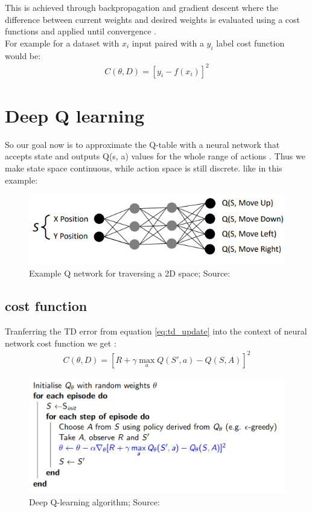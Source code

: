 This is achieved through backpropagation and gradient descent where the difference between current weights and desired weights is evaluated using a cost functions and applied until convergence \cite{lecture_intro_to_deep_rl} .\\

For example for a dataset with $x_i$ input paired with a $y_i$ label cost function would be: 
\begin{align}
    C(\theta, D) = [y_i - f(x_i)]^2
\end{align}

\section{Deep Q learning}

So our goal now is to approximate the Q-table with a neural network that accepts state and outputs Q(s, a) 
values for the whole range of actions \cite{lecture_intro_to_deep_rl}. Thus we make state space continuous, while action space is still discrete. like in this example:

\begin{figure}[h!]
  \centering
  \includegraphics[scale=0.5]{figures/q_network.PNG}
  \caption{Example Q network for traversing a 2D space; Source: \cite{lecture_dqn}}
  \label{fig:q_network  }
\end{figure}

\subsection{cost function}
Tranferring the TD error from equation \ref{eq:td_update} into the context of neural network cost function we get \cite{lecture_intro_to_deep_rl}:
\begin{align}
    C(\theta, D) = [R + \gamma \max_a Q(S', a) - Q(S, A)]^2
\end{align}
\begin{figure}[h!]
  \centering
  \includegraphics[scale=0.5]{figures/dqn_first.PNG}
  \caption{Deep Q-learning algorithm; Source: \cite{lecture_dqn}}
  \label{fig:dqn_first}
\end{figure}

